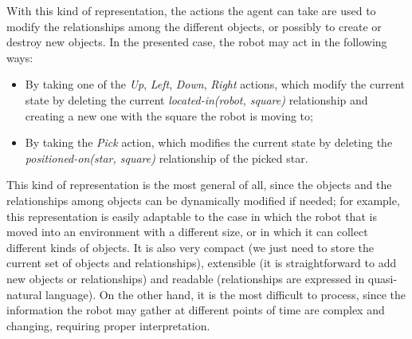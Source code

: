 \documentclass[letterpaper,headings=standardclasses]{scrartcl}
\begin{document}
With this kind of representation, the actions the agent can take are used to modify the relationships among the different objects, or possibly to create or destroy new objects. In the presented case, the robot may act in the following ways:

\begin{itemize}

\item By taking one of the \emph{Up}, \emph{Left}, \emph{Down}, \emph{Right} actions, which modify the current state by deleting the current \emph{located-in(robot, square)} relationship and creating a new one with the square the robot is moving to;

\item By taking the \emph{Pick} action, which modifies the current state by deleting the \emph{positioned-on(star, square)} relationship of the picked star.

\end{itemize}

This kind of representation is the most general of all, since the objects and the relationships among objects can be dynamically modified if needed; for example, this representation is easily adaptable to the case in which the robot that is moved into an environment with a different size, or in which it can collect different kinds of objects. It is also very compact (we just need to store the current set of objects and relationships), extensible (it is straightforward to add new objects or relationships) and readable (relationships are expressed in quasi-natural language). On the other hand, it is the most difficult to process, since the information the robot may gather at different points of time are complex and changing, requiring proper interpretation.
\end{document}
